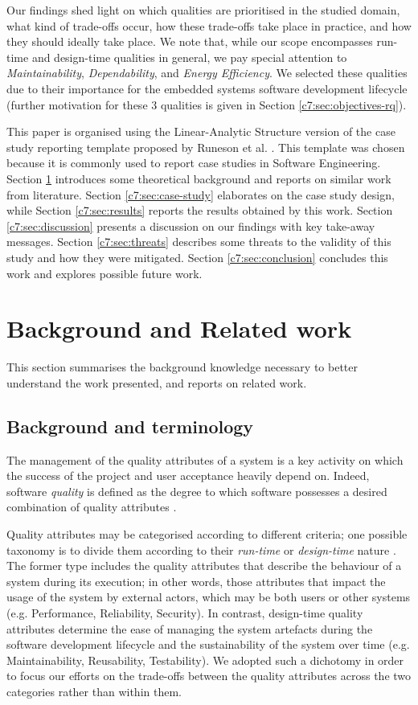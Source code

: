 Our findings shed light on which qualities are prioritised in the studied domain, what kind of trade-offs occur, how these trade-offs take place in practice, and how they should ideally take place. We note that, while our scope encompasses run-time and design-time qualities in general, we pay special attention to  \textit{Maintainability}, \textit{Dependability}, and \textit{Energy Efficiency}. We selected these qualities due to their importance for the embedded systems software development lifecycle \cite{Knight2002,Koopman2004} (further motivation for these 3 qualities is given in Section \ref{c7:sec:objectives-rq}). 

This paper is organised using the Linear-Analytic Structure version of the case study reporting template proposed by Runeson et al. \cite{Runeson2012}. This template was chosen because it is commonly used to report case studies in Software Engineering.
Section \ref{c7:sec:background} introduces some theoretical background and reports on similar work from literature.
Section \ref{c7:sec:case-study} elaborates on the case study design, while Section \ref{c7:sec:results} reports the results obtained by this work. Section \ref{c7:sec:discussion} presents a discussion on our findings with key take-away messages.
Section \ref{c7:sec:threats} describes some threats to the validity of this study and how they were mitigated.
Section \ref{c7:sec:conclusion} concludes this work and explores possible future work.

\section{Background and Related work}\label{c7:sec:background}
This section summarises the background knowledge necessary to better understand the work presented, and reports on related work.

\subsection{Background and terminology}
The management of the quality attributes of a system is a key activity on which the success of the project and user acceptance heavily depend on.
Indeed, software \textit{quality} is defined as the degree to which software possesses a desired combination of quality attributes \cite{Barbacci1995,IEEE10611992}.

Quality attributes may be categorised according to different criteria; one possible taxonomy is to divide them according to their \textit{run-time} or \textit{design-time} nature \cite{Bass2012}.
The former type includes the quality attributes that describe the behaviour of a system during its execution; in other words, those attributes that impact the usage of the system by external actors, which may be both users or other systems (e.g. Performance, Reliability, Security).
In contrast, design-time quality attributes determine the ease of managing the system artefacts during the software development lifecycle and the sustainability of the system over time (e.g. Maintainability, Reusability, Testability). We adopted such a dichotomy in order to focus our efforts on the trade-offs between the quality attributes across the two categories rather than within them.

